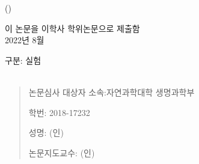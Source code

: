 
\begin{titlepage}
  \begin{spacing}{1.6}
    \makeatletter
    \begin{center}
      { \\}
      \vfill
      {\LARGE \@title\\}
      {\Large (\@titlealt)\\}

      \vfill

      {\Large
        이 논문을 이학사 학위논문으로 제출함 \\
        2022년 8월 \\
      }


      \vfill

      {\Large
        구분: 실험 \\
        \hfill\\
      }
    \end{center}
    \begin{quote}
      {\large
        논문심사 대상자 소속:\hfill 자연과학대학 생명과학부 \hfill \phantom{(인)} \par
        \phantom{논문심사 대상자} 학번: \hfill 2018-17232 \hfill \phantom{(인)} \par
        \phantom{논문심사 대상자} 성명: \hfill \@author \hfill (인) \par
        \par
        논문지도교수: \hfill \@advisor \hfill (인)
      }
    \end{quote}

    \vspace*{2cm}
    \makeatother
  \end{spacing}
\end{titlepage}
